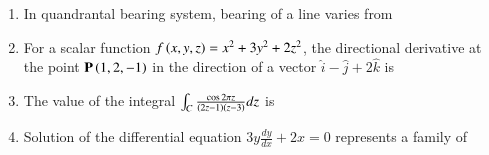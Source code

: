 \documentclass[journal,12pt,onecolumn]{IEEEtran}
\theoremstyle{remark}
\begin{document}
\begin{enumerate}
\item In quandrantal bearing system, bearing of a line varies from 

\hfill{}
\begin{enumerate}
\end{enumerate}

\item For a scalar function $f\left(x,y,z\right)=x^2+3y^2+2z^2$, the directional derivative at the point $\mathbf{P}\left(1,2,-1\right)$ in the direction of a vector $\hat{i}-\hat{j}+2\hat{k}$ is

\hfill{}
\begin{enumerate}
\end{enumerate}

\item The value of the integral $\int_{C}\frac{\cos{2\pi z}}{\left(2z-1\right)\left(z-3\right)}dz$  is

\hfill{}
\begin{enumerate}
\end{enumerate}

\item Solution of the differential equation $3y\frac{dy}{dx}+2x=0$ represents a family of 

\hfill{}
\begin{enumerate}
\end{enumerate}


\end{enumerate}
\end{document}
